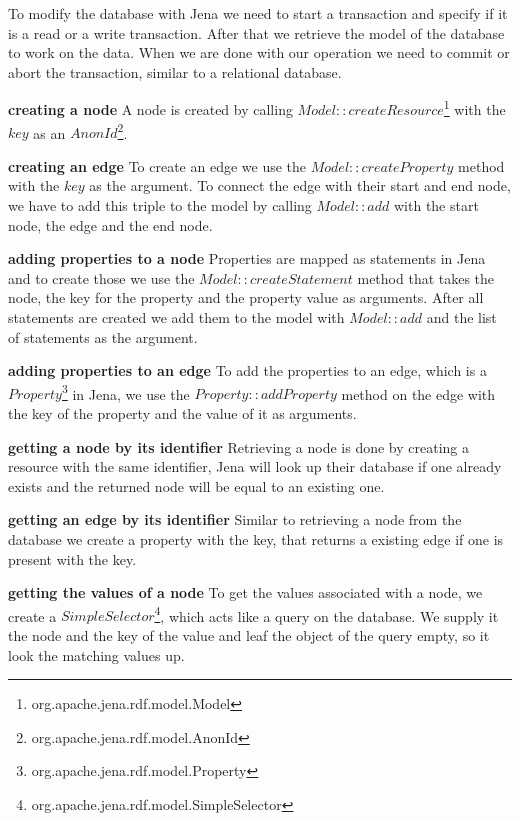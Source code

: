 To modify the database with Jena we need to start a transaction and specify if it is a read or a write transaction.
After that we retrieve the model of the database to work on the data.
When we are done with our operation we need to commit or abort the transaction,
similar to a relational database.

\textbf{creating a node} \newline
A node is created by calling $ Model::createResource $\footnote{org.apache.jena.rdf.model.Model} with the $ key $ as an $ AnonId $\footnote{org.apache.jena.rdf.model.AnonId}.

\textbf{creating an edge} \newline
To create an edge we use the $ Model::createProperty $ method with the $ key $ as the argument.
To connect the edge with their start and end node,
we have to add this triple to the model by calling $ Model::add $ with the start node,
the edge and the end node.

\textbf{adding properties to a node} \newline
Properties are mapped as statements in Jena and to create those we use the $ Model::createStatement $ method that takes the node, the key for the property and the property value as arguments.
After all statements are created we add them to the model with $ Model::add $ and the list of statements as the argument.

\textbf{adding properties to an edge} \newline
To add the properties to an edge,
which is a $ Property $\footnote{org.apache.jena.rdf.model.Property} in Jena,
we use the $ Property::addProperty $ method on the edge with the key of the property and the value of it as arguments.

\textbf{getting a node by its identifier} \newline
Retrieving a node is done by creating a resource with the same identifier,
Jena will look up their database if one already exists and the returned node will be equal to an existing one.

\textbf{getting an edge by its identifier} \newline
Similar to retrieving a node from the database we create a property with the key,
that returns a existing edge if one is present with the key.

\textbf{getting the values of a node} \newline
To get the values associated with a node,
we create a $ SimpleSelector $\footnote{org.apache.jena.rdf.model.SimpleSelector},
which acts like a query on the database.
We supply it the node and the key of the value and leaf the object of the query empty,
so it look the matching values up.

